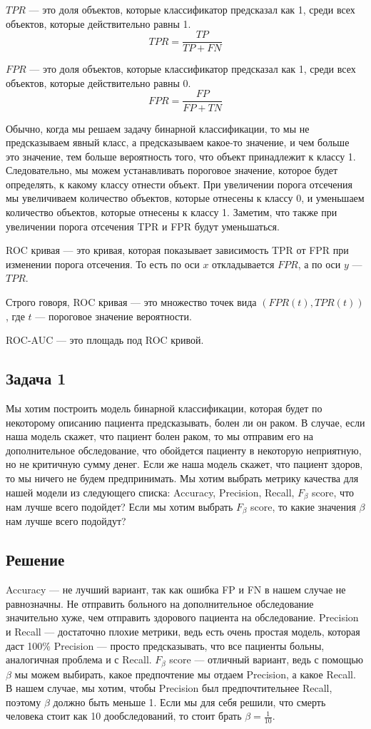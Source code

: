 $TPR$ --- это доля объектов, которые классификатор предсказал как 1, среди всех объектов, которые действительно равны 1.
$$
    TPR = \frac{TP}{TP + FN}
$$

$FPR$ --- это доля объектов, которые классификатор предсказал как 1, среди всех объектов, которые действительно равны 0.
$$
    FPR = \frac{FP}{FP + TN}
$$

Обычно, когда мы решаем задачу бинарной классификации, то мы не предсказываем явный класс, а предсказываем какое-то значение, и чем больше это значение, тем больше вероятность того, что объект принадлежит к классу 1.
Следовательно, мы можем устанавливать пороговое значение, которое будет определять, к какому классу отнести объект.
При увеличении порога отсечения мы увеличиваем количество объектов, которые отнесены к классу 0, и уменьшаем количество объектов, которые отнесены к классу 1.
Заметим, что также при увеличении порога отсечения TPR и FPR будут уменьшаться.

ROC кривая --- это кривая, которая показывает зависимость TPR от FPR при изменении порога отсечения. То есть по оси $x$ откладывается $FPR$, а по оси $y$ --- $TPR$.

Строго говоря, ROC кривая --- это множество точек вида $(FPR(t), TPR(t))$, где $t$ --- пороговое значение вероятности.

ROC-AUC --- это площадь под ROC кривой.

\subsection*{Задача 1}

Мы хотим построить модель бинарной классификации, которая будет по некоторому описанию пациента предсказывать, болен ли он раком.
В случае, если наша модель скажет, что пациент болен раком, то мы отправим его на дополнительное обследование, что обойдется пациенту в некоторую неприятную, но не критичную сумму денег.
Если же наша модель скажет, что пациент здоров, то мы ничего не будем предпринимать.
Мы хотим выбрать метрику качества для нашей модели из следующего списка: Accuracy, Precision, Recall, $F_{\beta}$ score, что нам лучше всего подойдет?
Если мы хотим выбрать $F_{\beta}$ score, то какие значения $\beta$ нам лучше всего подойдут?

\subsection*{Решение}
Accuracy --- не лучший вариант, так как ошибка FP и FN в нашем случае не равнозначны.
Не отправить больного на дополнительное обследование значительно хуже, чем отправить здорового пациента на обследование.
Precision и Recall --- достаточно плохие метрики, ведь есть очень простая модель, которая даст 100\% Precision --- просто предсказывать, что все пациенты больны, аналогичная проблема и с Recall.
$F_{\beta}$ score --- отличный вариант, ведь с помощью $\beta$ мы можем выбирать, какое предпочтение мы отдаем Precision, а какое Recall.
В нашем случае, мы хотим, чтобы Precision был предпочтительнее Recall, поэтому $\beta$ должно быть меньше 1.
Если мы для себя решили, что смерть человека стоит как 10 дообследований, то стоит брать $\beta = \frac{1}{10}$.

